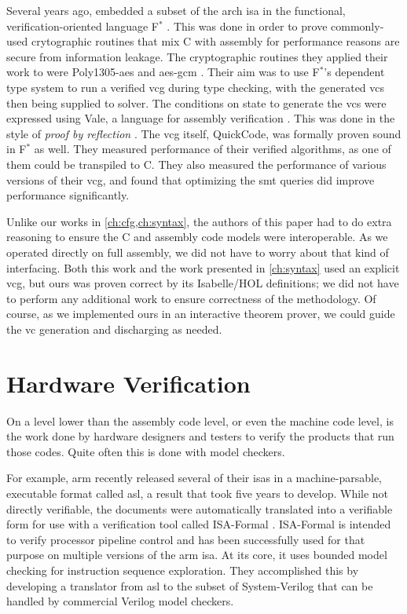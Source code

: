 Several years ago, \textcite{fromherz2019verified} embedded a subset
of the \gls{arch} \ac{isa} in the functional, verification-oriented language
F$^*$ \autocite{fstar}.
This was done in order to prove commonly-used crytographic routines
that mix C with assembly for performance reasons are secure from information leakage.
The cryptographic routines they applied their work to were
Poly1305-\ac{aes} \autocite{bernstein2005poly1305} and
\ac{aes}-\ac{gcm} \autocite{dworkin2007recommendation}.
Their aim was to use F$^*$'s dependent type system to run a verified \ac{vcg}
during type checking, with the generated \acp{vc}
then being supplied to  solver.
The conditions on state to generate the \acp{vc} were expressed using Vale,
a language for assembly verification \autocite{bond2017vale}.
This was done in the style of \emph{proof by reflection} \autocite{bertot2004reflection}.
The \ac{vcg} itself, QuickCode, was formally proven sound in F$^*$ as well.
They measured performance of their verified algorithms, as one of them could be
transpiled to C. They also measured the performance of various versions
of their \ac{vcg}, and found that optimizing the \ac{smt} queries did improve performance
significantly.

Unlike our works in \cref{ch:cfg,ch:syntax}, the authors of this paper
had to do extra reasoning to ensure the C and assembly code models were interoperable.
As we operated directly on full assembly, we did not have to worry about
that kind of interfacing. Both this work and the work presented in \cref{ch:syntax} used an explicit \ac{vcg},
but ours was proven correct by its Isabelle/HOL definitions;
we did not have to perform any additional work to ensure correctness
of the methodology.
Of course, as we implemented ours in an interactive theorem prover,
we could guide the \ac{vc} generation and discharging as needed.

\section{Hardware Verification}\label{se:hardware}
On a level lower than the assembly code level, or even the machine code level,
is the work done by hardware designers and testers
to verify the products that run those codes.
Quite often this is done with model checkers.

For example, \gls{arm} recently released several of their \acp{isa} in a machine-parsable,
executable format called \ac{asl}, a result that took five years to develop.
While not directly verifiable, the documents were automatically translated into
a verifiable form for use with a verification tool
called ISA-Formal \autocite{reid2016endtoend}.
ISA-Formal is intended to verify processor pipeline control
and has been successfully used for that purpose on multiple versions of the \gls{arm} \ac{isa}.
At its core, it uses bounded model checking for instruction sequence exploration.
They accomplished this by developing a translator from \ac{asl}
to the subset of System-Verilog that can be handled by commercial Verilog model checkers.

